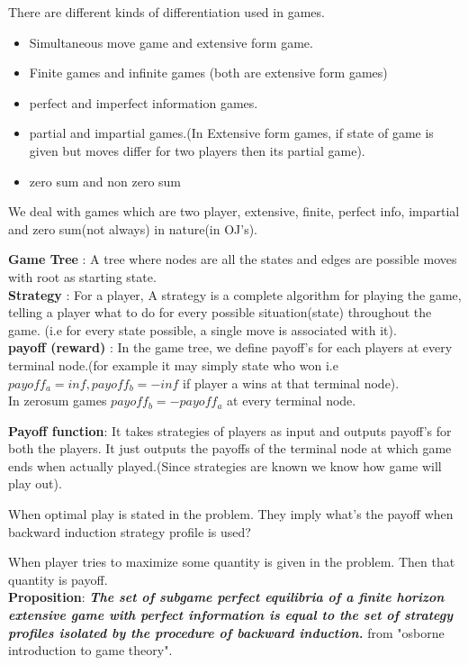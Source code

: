 \documentclass[../Notes.tex]{subfiles}
\begin{document}
There are different kinds of differentiation used in games.
\begin{itemize}
	\item Simultaneous move game and extensive form game.
	\item Finite games and infinite games (both are extensive form games)
	\item perfect and imperfect information games.
	\item partial and impartial games.(In Extensive form games, if state of game is given but moves differ for two players then its partial game).
	\item zero sum and non zero sum
\end{itemize}

We deal with games which are two player, extensive, finite, perfect info, impartial and zero sum(not always) in nature(in OJ's).
 
\textbf{Game Tree} : A tree where nodes are all the states and edges are possible moves with root as starting state.\\
\textbf{Strategy} : For a player, A strategy is a complete algorithm for playing the game, telling a player what to do for every possible situation(state) throughout the game. (i.e for every state possible, a single move is associated with it).\\
\textbf{payoff (reward)} : In the game tree, we define payoff's for each players at every terminal node.(for example it may simply state who won i.e $payoff_{a}=inf, payoff_{b}=-inf$ if player a wins at that terminal node).\\
In zerosum games $payoff_{b} = -payoff_{a}$ at every terminal node.

\textbf{Payoff function}: It takes strategies of players as input and outputs payoff's for both the players. It just outputs the payoffs of the terminal node at which game ends when actually played.(Since strategies are known we know how game will play out).

When optimal play is stated in the problem. They imply what's the payoff when backward induction strategy profile is used?

When player tries to maximize some quantity is given in the problem. Then that quantity is payoff.\\
\textbf{Proposition}:\textbf{ \textit{The set of subgame perfect equilibria of a finite horizon extensive game with perfect information is equal to the set of strategy profiles isolated by the procedure of backward induction.}} from "osborne introduction to game theory". \\
\end{document}
